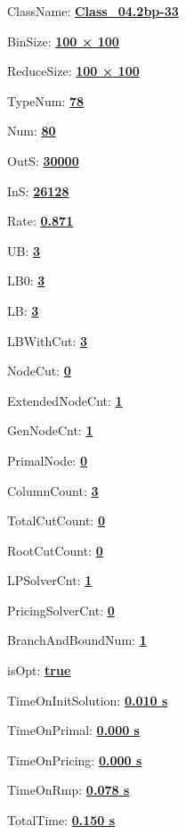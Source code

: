 \documentclass[11pt]{article}
\begin{document}
\pagestyle{empty}


ClassName: \underline{\textbf{Class_04.2bp-33}}
\par
BinSize: \underline{\textbf{100 × 100}}
\par
ReduceSize: \underline{\textbf{100 × 100}}
\par
TypeNum: \underline{\textbf{78}}
\par
Num: \underline{\textbf{80}}
\par
OutS: \underline{\textbf{30000}}
\par
InS: \underline{\textbf{26128}}
\par
Rate: \underline{\textbf{0.871}}
\par
UB: \underline{\textbf{3}}
\par
LB0: \underline{\textbf{3}}
\par
LB: \underline{\textbf{3}}
\par
LBWithCut: \underline{\textbf{3}}
\par
NodeCut: \underline{\textbf{0}}
\par
ExtendedNodeCnt: \underline{\textbf{1}}
\par
GenNodeCnt: \underline{\textbf{1}}
\par
PrimalNode: \underline{\textbf{0}}
\par
ColumnCount: \underline{\textbf{3}}
\par
TotalCutCount: \underline{\textbf{0}}
\par
RootCutCount: \underline{\textbf{0}}
\par
LPSolverCnt: \underline{\textbf{1}}
\par
PricingSolverCnt: \underline{\textbf{0}}
\par
BranchAndBoundNum: \underline{\textbf{1}}
\par
isOpt: \underline{\textbf{true}}
\par
TimeOnInitSolution: \underline{\textbf{0.010 s}}
\par
TimeOnPrimal: \underline{\textbf{0.000 s}}
\par
TimeOnPricing: \underline{\textbf{0.000 s}}
\par
TimeOnRmp: \underline{\textbf{0.078 s}}
\par
TotalTime: \underline{\textbf{0.150 s}}
\par
\newpage
\end{document}
